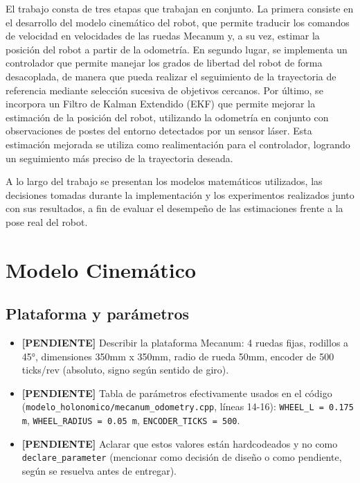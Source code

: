 \documentclass[11pt,a4paper]{article}
\newcommand{\TODO}[1]{\textcolor{todocolor}{\textbf{[PENDIENTE]} #1}}
\newenvironment{tareas}{\begin{itemize}\setlength{\itemsep}{2pt}}{\end{itemize}}
\begin{document}
El trabajo consta de tres etapas que trabajan en conjunto. La primera consiste en el desarrollo del modelo cinemático del robot, que permite traducir los comandos de velocidad en velocidades de las ruedas Mecanum y, a su vez, estimar la posición del robot a partir de la odometría. En segundo lugar, se implementa un controlador que permite manejar los grados de libertad del robot de forma desacoplada, de manera que pueda realizar el seguimiento de la trayectoria de referencia mediante selección sucesiva de objetivos cercanos. Por último, se incorpora un Filtro de Kalman Extendido (EKF) que permite mejorar la estimación de la posición del robot, utilizando la odometría en conjunto con observaciones de postes del entorno detectados por un sensor láser. Esta estimación mejorada se utiliza como realimentación para el controlador, logrando un seguimiento más preciso de la trayectoria deseada.

A lo largo del trabajo se presentan los modelos matemáticos utilizados, las decisiones tomadas durante la implementación y los experimentos realizados junto con sus resultados, a fin de evaluar el desempeño de las estimaciones frente a la pose real del robot.

\section{Modelo Cinemático}
\subsection{Plataforma y parámetros}
\begin{tareas}
    \item \TODO{Describir la plataforma Mecanum: 4 ruedas fijas, rodillos a 45°, dimensiones 350mm x 350mm, radio de rueda 50mm, encoder de 500 ticks/rev (absoluto, signo según sentido de giro).}
    \item \TODO{Tabla de parámetros efectivamente usados en el código (\texttt{modelo\_holonomico/mecanum\_odometry.cpp}, líneas 14-16): \texttt{WHEEL\_L = 0.175 m}, \texttt{WHEEL\_RADIUS = 0.05 m}, \texttt{ENCODER\_TICKS = 500}.}
    \item \TODO{Aclarar que estos valores están hardcodeados y no como \texttt{declare\_parameter} (mencionar como decisión de diseño o como pendiente, según se resuelva antes de entregar).}
\end{tareas}
\end{document}
